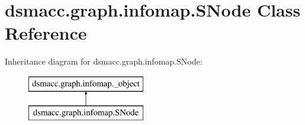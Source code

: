 \hypertarget{classdsmacc_1_1graph_1_1infomap_1_1SNode}{}\section{dsmacc.\+graph.\+infomap.\+S\+Node Class Reference}
\label{classdsmacc_1_1graph_1_1infomap_1_1SNode}
Inheritance diagram for dsmacc.\+graph.\+infomap.\+S\+Node\+:\begin{figure}[H]
\begin{center}
\leavevmode
\includegraphics[height=2.000000cm]{classdsmacc_1_1graph_1_1infomap_1_1SNode}
\end{center}
\end{figure}
